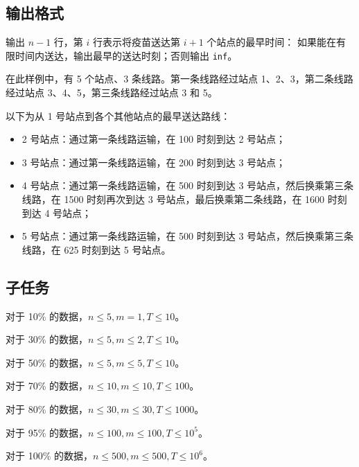 \subsection*{输出格式}

输出 $n - 1$ 行，第 $i$ 行表示将疫苗送达第 $i+1$ 个站点的最早时间：
如果能在有限时间内送达，输出最早的送达时刻；否则输出 \verb|inf|。

\examplebox{}{}

\examplebox*{}{}

在此样例中，有 5 个站点、3 条线路。第一条线路经过站点 1、2、3，第二条线路经过站点 3、4、5，第三条线路经过站点 3 和 5。

以下为从 1 号站点到各个其他站点的最早送达路线：

\begin{itemize}
    \item 2 号站点：通过第一条线路运输，在 100 时刻到达 2 号站点；
    \item 3 号站点：通过第一条线路运输，在 200 时刻到达 3 号站点；
    \item 4 号站点：通过第一条线路运输，在 500 时刻到达 3 号站点，然后换乘第三条线路，在 1500 时刻再次到达 3 号站点，最后换乘第二条线路，在 1600 时刻到达 4 号站点；
    \item 5 号站点：通过第一条线路运输，在 500 时刻到达 3 号站点，然后换乘第三条线路，在 625 时刻到达 5 号站点。
\end{itemize}

\examplebox{}{}

\subsection*{子任务}

对于 10\% 的数据，$n\le 5,m=1,T\le 10$。

对于 30\% 的数据，$n\le 5,m\le 2,T\le 10$。

对于 50\% 的数据，$n\le 5,m\le 5,T\le 10$。

对于 70\% 的数据，$n\le 10,m\le 10,T\le 100$。

对于 80\% 的数据，$n\le 30,m\le 30,T\le 1000$。

对于 95\% 的数据，$n\le 100,m\le 100,T\le 10^5$。

对于 100\% 的数据，$n\le 500,m\le 500,T\le 10^6$。